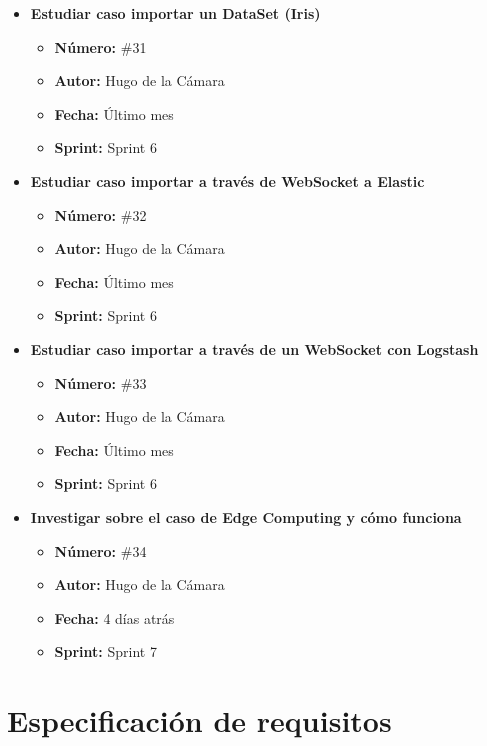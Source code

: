 \begin{itemize}
    \item \textbf{Estudiar caso importar un DataSet (Iris)}
    \begin{itemize}
        \item \textbf{Número:} \#31
        \item \textbf{Autor:} Hugo de la Cámara
        \item \textbf{Fecha:} Último mes
        \item \textbf{Sprint:} Sprint 6
    \end{itemize}
    
    \item \textbf{Estudiar caso importar a través de WebSocket a Elastic}
    \begin{itemize}
        \item \textbf{Número:} \#32
        \item \textbf{Autor:} Hugo de la Cámara
        \item \textbf{Fecha:} Último mes
        \item \textbf{Sprint:} Sprint 6
    \end{itemize}
    
    \item \textbf{Estudiar caso importar a través de un WebSocket con Logstash}
    \begin{itemize}
        \item \textbf{Número:} \#33
        \item \textbf{Autor:} Hugo de la Cámara
        \item \textbf{Fecha:} Último mes
        \item \textbf{Sprint:} Sprint 6
    \end{itemize}
    
    \item \textbf{Investigar sobre el caso de Edge Computing y cómo funciona}
    \begin{itemize}
        \item \textbf{Número:} \#34
        \item \textbf{Autor:} Hugo de la Cámara
        \item \textbf{Fecha:} 4 días atrás
        \item \textbf{Sprint:} Sprint 7
    \end{itemize}

\end{itemize}


\section{Especificación de requisitos}

